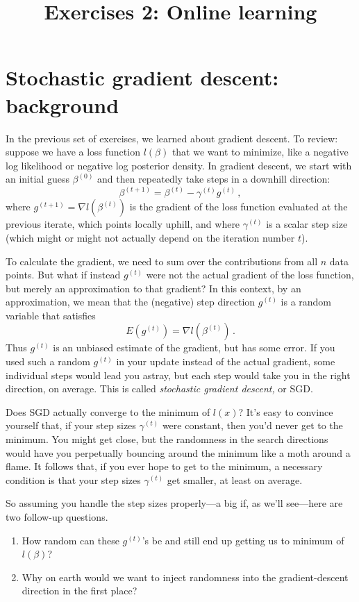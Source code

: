 \documentclass{mynotes}
\title[Exercises 2 $\cdot$ SDS 385]{Exercises 2: Online learning}
\date{}  %
\begin{document}
\maketitle%


\section{Stochastic gradient descent: background}

In the previous set of exercises, we learned about gradient descent.  To review: suppose we have a loss function $l(\beta)$ that we want to minimize, like a negative log likelihood or negative log posterior density.  In gradient descent, we start with an initial guess $\beta^{(0)}$ and then repeatedly take steps in a downhill direction:
$$
\beta^{(t+1)} = \beta^{(t)} - \gamma^{(t)} g^{(t)} \, ,
$$
where $g^{(t+1)}  = \nabla l(\beta^{(t)})$ is the gradient of the loss function evaluated at the previous iterate, which points locally uphill, and where $ \gamma^{(t)}$ is a scalar step size (which might or might not actually depend on the iteration number $t$).

To calculate the gradient, we need to sum over the contributions from all $n$ data points.  But what if instead $g^{(t)}$ were not the actual gradient of the loss function, but merely an approximation to that gradient?  In this context, by an approximation, we mean that the (negative) step direction $g^{(t)}$ is a random variable that satisfies
$$
E(g^{(t)}) = \nabla l(\beta^{(t)}) \, .
$$
Thus $g^{(t)}$ is an unbiased estimate of the gradient, but has some error.   If you used such a random $g^{(t)}$ in your update instead of the actual gradient, some individual steps would lead you astray, but each step would take you in the right direction, on average.  This is called \textit{stochastic gradient descent,} or SGD. 

Does SGD actually converge to the minimum of $l(x)$?  It's easy to convince yourself that, if your step sizes $\gamma^{(t)}$ were constant, then you'd never get to the minimum.  You might get close, but the randomness in the search directions would have you perpetually bouncing around the minimum like a moth around a flame.  It follows that, if you ever hope to get to the minimum, a necessary condition is that your step sizes $\gamma^{(t)}$ get smaller, at least on average.

So assuming you handle the step sizes properly---a big if, as we'll see---here are two follow-up questions.
\begin{enumerate}
\item How random can these $g^{(t)}$'s be and still end up getting us to minimum of $l(\beta)$? 
\item Why on earth would we want to inject randomness into the gradient-descent direction in the first place?
\end{enumerate}
\end{document}
